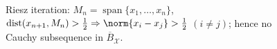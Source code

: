 \begin{figure}[H]
  \centering
  
  \caption{Riesz iteration: $M_n=\operatorname{span}\{x_1,\ldots,x_n\}$, $\operatorname{dist}(x_{n+1},M_n)>\frac{1}{2}\Rightarrow \norm{x_i-x_j}>\frac{1}{2}$ $(i\neq j)$; hence no Cauchy subsequence in $\overline{B}_{\mathcal X}$.}
  \label{fig:riesz-lemma-separated-unit-ball}
\end{figure}
